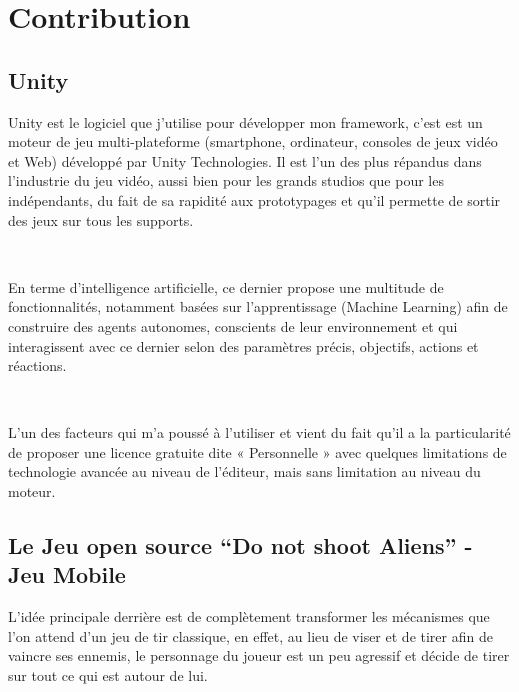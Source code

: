 
\chapter{Contribution} %

\label{Chapter6} %


\section{Unity}

Unity est le logiciel que j'utilise pour développer mon framework, c’est est un moteur de jeu multi-plateforme (smartphone, ordinateur, consoles de jeux vidéo et Web) développé par Unity Technologies. Il est l'un des plus répandus dans l'industrie du jeu vidéo, aussi bien pour les grands studios que pour les indépendants, du fait de sa rapidité aux prototypages et qu'il permette de sortir des jeux sur tous les supports.


~\par
En terme d’intelligence artificielle, ce dernier propose une multitude de fonctionnalités, notamment basées sur l’apprentissage (Machine Learning) afin de construire des agents autonomes, conscients de leur environnement et qui interagissent avec ce dernier selon des paramètres précis, objectifs, actions et réactions.

~\par
L’un des facteurs qui m’a poussé à l’utiliser et vient du fait qu'il a la particularité de proposer une licence gratuite dite « Personnelle » avec quelques limitations de technologie avancée au niveau de l'éditeur, mais sans limitation au niveau du moteur.  



\section{Le Jeu open source “Do not shoot Aliens” - Jeu Mobile}

L'idée principale derrière est de complètement transformer les mécanismes que l’on attend d'un jeu de tir classique, en effet,  au lieu de viser et de tirer afin de vaincre ses ennemis, le personnage du joueur est un peu agressif et décide de tirer sur tout ce qui est autour de lui. 

